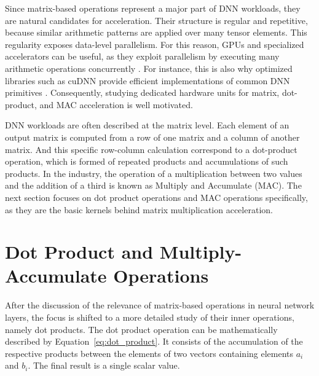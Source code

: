 Since matrix-based operations represent a major part of DNN workloads, they are natural candidates for acceleration. Their structure is regular and repetitive, because similar arithmetic patterns are applied over many tensor elements. This regularity exposes data-level parallelism. For this reason, GPUs and specialized accelerators can be useful, as they exploit parallelism by executing many arithmetic operations concurrently \cite{sze2017efficient}. For instance, this is also why optimized libraries such as cuDNN provide efficient implementations of common DNN primitives \cite{chetlur2014cudnn}. Consequently, studying dedicated hardware units for matrix, dot-product, and MAC acceleration is well motivated.

DNN workloads are often described at the matrix level. Each element of an output matrix is computed from a row of one matrix and a column of another matrix. And this specific row-column calculation correspond to a dot-product operation, which is formed of repeated products and accumulations of such products. In the industry, the operation of a multiplication between two values and the addition of a third is known as Multiply and Accumulate (MAC). The next section focuses on dot product operations and MAC operations specifically, as  they are the basic kernels behind matrix multiplication acceleration.


\section{Dot Product and Multiply-Accumulate Operations}
\label{sec:dpus_structures}


After the discussion of the relevance of matrix-based operations in neural network layers, the focus is shifted to a more detailed study of their inner operations, namely dot products. The dot product operation can be mathematically described by Equation~\eqref{eq:dot_product}. It consists of the accumulation of the respective products between the elements of two vectors containing elements $a_i$ and $b_i$. The final result is a single scalar value.

